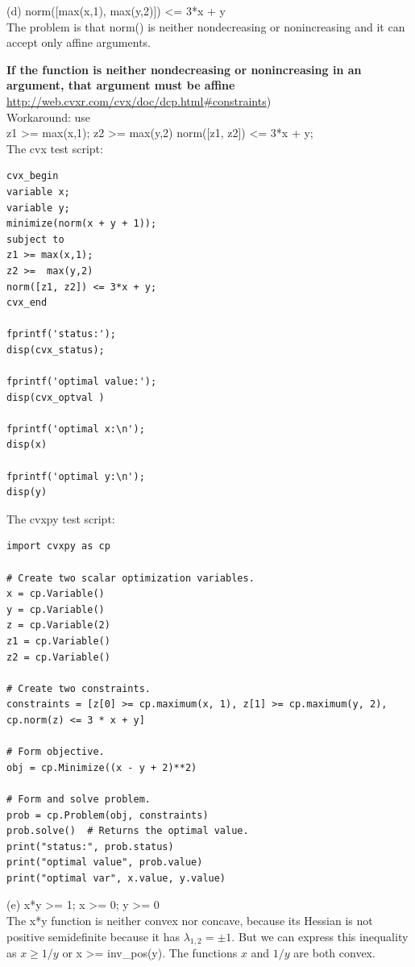 \documentclass{article}
\begin{document}
(d) norm([max(x,1), max(y,2)]) \textless= 3*x + y\\

The problem is that norm() is neither nondecreasing or nonincreasing and it can accept only affine arguments.

{\bf If the function is neither nondecreasing or nonincreasing in an argument, that argument must be affine}
\\
\url{http://web.cvxr.com/cvx/doc/dcp.html#constraints})
\\

Workaround: use \\
z1 \textgreater= max(x,1);
z2 \textgreater=  max(y,2)
norm([z1, z2]) \textless= 3*x + y;\\

The cvx test script:
\begin{verbatim}
cvx_begin
variable x;
variable y;
minimize(norm(x + y + 1));
subject to
z1 >= max(x,1);
z2 >=  max(y,2)
norm([z1, z2]) <= 3*x + y;
cvx_end

fprintf('status:'); 
disp(cvx_status);

fprintf('optimal value:'); 
disp(cvx_optval )

fprintf('optimal x:\n'); 
disp(x)

fprintf('optimal y:\n'); 
disp(y)
\end{verbatim}

The cvxpy test script:
\begin{verbatim}
import cvxpy as cp

# Create two scalar optimization variables.
x = cp.Variable()
y = cp.Variable()
z = cp.Variable(2)
z1 = cp.Variable()
z2 = cp.Variable()

# Create two constraints.
constraints = [z[0] >= cp.maximum(x, 1), z[1] >= cp.maximum(y, 2), 
cp.norm(z) <= 3 * x + y]

# Form objective.
obj = cp.Minimize((x - y + 2)**2)

# Form and solve problem.
prob = cp.Problem(obj, constraints)
prob.solve()  # Returns the optimal value.
print("status:", prob.status)
print("optimal value", prob.value)
print("optimal var", x.value, y.value)
\end{verbatim}

(e) x*y \textgreater= 1; x \textgreater= 0; 
y \textgreater= 0\\

The x*y function is neither convex nor concave, because its Hessian is not positive semidefinite because 
it has $\lambda_{1, 2} = \pm 1 $. But we can express this inequality as  $x \geq 1 / y$ 
or x \textgreater= inv\_pos(y).  
The functions $x$ and $1/y$ are both convex.
\end{document}
